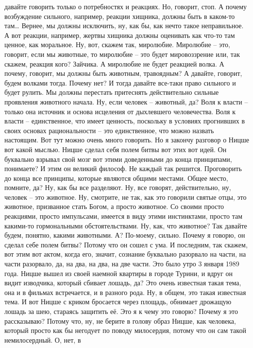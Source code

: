 давайте говорить только о потребностях и реакциях. Но, говорит, стоп. А почему
возбуждение сильного, например, реакции хищника, должны быть в каком-то там…
Вернее, мы должны исключить, ну, как бы, как нечто такое неправильное. А вот
реакции, например, жертвы хищника должны оценивать как что-то там ценное, как
моральное. Ну, вот, скажем так, миролюбие. Миролюбие – это, говорит, если мы
животные, то миролюбие – это будет мировоззрение или, так скажем, реакция кого?
Зайчика. А миролюбие не будет реакцией волка. А почему, говорит, мы должны быть
животным, травоядным? А давайте, говорит, будем волками тогда. Почему нет? И
тогда давайте все-таки право сильного и будет рулить. Мы должны перестать
притеснять действительно сильные проявления животного начала. Ну, если человек –
животный, да? Воля к власти – только она источник и основа исцеления от
дыхлевшего человечества. Воля к власти – единственное, что имеет ценность,
поскольку в условиях прогнивших в своих основах рациональности – это
единственное, что можно назвать настоящим. Вот тут можно очень много говорить.
Но я закончу разговор о Ницше вот какой мыслью. Ницше сделал себя полем битвы
вот этих вот идей. Он буквально взрывал свой мозг вот этими доведенными до конца
принципами, понимаете? И этим он великий философ. Не каждый так решится.
Проговорить до конца все принципы, которые являются общими местами. Общее место,
помните, да? Ну, как бы все разделяют. Ну, все говорят, действительно, ну,
человек – это животное. Ну, смотрите, не так, как это говорили святые отцы, это
животное, призванное стать Богом, а просто животное. Со своими просто реакциями,
просто импульсами, имеется в виду этими инстинктами, просто там какими-то
гормональными обстоятельствами. Ну, как, что животное? Так давайте будем,
понятно, какими животными. А? По-моему, сильно. Почему я говорю, он сделал себе
полем битвы? Потому что он сошел с ума. И последним, так скажем, вот этим вот
актом, когда его, значит, сознание буквально разорвало на части, на части
разорвало, да, на два, на два, на две части. Это было утро 3 января 1989 года.
Ницше вышел из своей наемной квартиры в городе Турини, и вдруг он видит
изводчика, который сбивает лошадь, да? Это очень известная такая тема, она и в
фильмах встречается, и в разного рода. Ну, в общем, это такая известная тема. И
вот Ницше с криком бросается через площадь, обнимает дрожащую лошадь за шею,
стараясь защитить её. Это я к чему это говорю? Почему я это рассказываю? Потому
что, ну, не берите в голову образ Ницше, как человека, который просто как бы
негодует по поводу милосердия, потому что он сам такой немилосердный. О, нет, в
